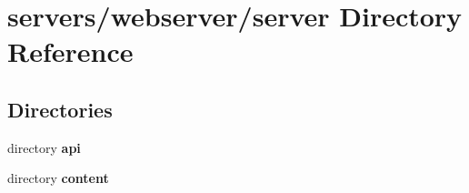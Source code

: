 \section{servers/webserver/server Directory Reference}
\label{dir_6ffe93b5575ab440577361a77dc0ee07}
\subsection*{Directories}
\begin{DoxyCompactItemize}
\item 
directory \textbf{ api}
\item 
directory \textbf{ content}
\end{DoxyCompactItemize}
